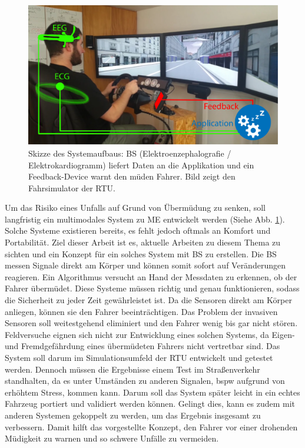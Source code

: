 {\begin{figure} 
  \begin{center}
    \includegraphics[width=12cm]{img/aufbau}
    \caption{Skizze des Systemaufbaus: \acl{BS} (Elektroenzephalografie / Elektrokardiogramm) liefert Daten an die Applikation und ein Feedback-Device warnt den müden Fahrer. Bild zeigt den Fahrsimulator der \acl{RTU}.}
    \label{fig:sketch}
  \end{center}
\end{figure}

Um das Risiko eines Unfalls auf Grund von Übermüdung zu senken, soll langfristig ein multimodales System zu \acl{ME} entwickelt werden (Siehe Abb. \ref{fig:sketch}). Solche Systeme existieren bereits, es fehlt jedoch oftmals an Komfort und Portabilität. Ziel dieser Arbeit ist es, aktuelle Arbeiten zu diesem Thema zu sichten und ein Konzept für ein solches System mit \acl{BS} zu erstellen. Die \acl{BS} messen Signale direkt am Körper und können somit sofort auf Veränderungen reagieren. Ein Algorithmus versucht an Hand der Messdaten zu erkennen, ob der Fahrer übermüdet. Diese Systeme müssen richtig und genau funktionieren, sodass die Sicherheit zu jeder Zeit gewährleistet ist. Da die Sensoren direkt am Körper anliegen, können sie den Fahrer beeinträchtigen. Das Problem der invasiven Sensoren soll weitestgehend eliminiert und den Fahrer wenig bis gar nicht stören. Feldversuche eignen sich nicht zur Entwicklung eines solchen Systems, da Eigen- und Fremdgefährdung eines übermüdeten Fahrers nicht vertretbar sind. Das System soll darum im Simulationsumfeld der \acl{RTU} entwickelt und getestet werden. Dennoch müssen die Ergebnisse einem Test im Straßenverkehr standhalten, da es unter Umständen zu anderen Signalen, \acl{bspw} aufgrund von erhöhtem Stress, kommen kann. Darum soll das System später leicht in ein echtes Fahrzeug portiert und validiert werden können. Gelingt dies, kann es zudem mit anderen Systemen gekoppelt zu werden, um das Ergebnis insgesamt zu verbessern. Damit hilft das vorgestellte Konzept, den Fahrer vor einer drohenden Müdigkeit zu warnen und so schwere Unfälle zu vermeiden.\\ 

}
